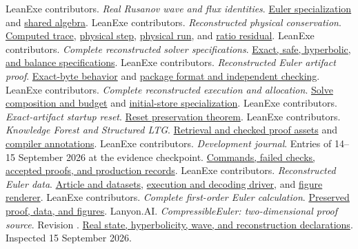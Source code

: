\documentclass[11pt]{article}
\newcommand{\longcode}[1]{\texttt{\seqsplit{#1}}}
\newcommand{\repo}[2]{\href{https://github.com/jsmorph/leanexe/blob/73e5b54ee6ba398cdd4d42feadc42e2c6ec5a33a/#1}{#2}}
\newcommand{\proofref}[2]{\repo{proofs/talos/lean/Project/#1}{#2}}
\begin{document}
\begin{thebibliography}{99}
 LeanExe contributors.  \emph{Real Rusanov wave and flux identities}.  \proofref{EulerRiemann/RealWaves.lean}{Euler specialization} and \proofref{ProofKit/RealLaxFriedrichs.lean}{shared algebra}.
 LeanExe contributors.  \emph{Reconstructed physical conservation}.  \proofref{EulerReconstructed/TraceBalance.lean}{Computed trace}, \proofref{EulerReconstructed/PhysicalStep.lean}{physical step}, \proofref{EulerReconstructed/PhysicalTrace.lean}{physical run}, and \proofref{EulerReconstructed/RatioResidual.lean}{ratio residual}.
 LeanExe contributors.  \emph{Complete reconstructed solver specifications}.  \proofref{EulerReconstructed/Spec.lean}{Exact, safe, hyperbolic, and balance specifications}.
 LeanExe contributors.  \emph{Reconstructed Euler artifact proof}.  \proofref{EulerReconstructed/ArtifactTranslation.lean}{Exact-byte behavior} and \repo{docs/artifact-format.md}{package format and independent checking}.
 LeanExe contributors.  \emph{Complete reconstructed execution and allocation}.  \proofref{EulerReconstructed/ExecutionSolve.lean}{Solve composition and budget} and \proofref{EulerReconstructed/SolveInitial.lean}{initial-store specialization}.
 LeanExe contributors.  \emph{Exact-artifact startup reset}.  \proofref{EulerReconstructed/HostInitial.lean}{Reset preservation theorem}.
 LeanExe contributors.  \emph{Knowledge Forest and Structured LTG}.  \repo{docs/ltg.md}{Retrieval and checked proof assets} and \repo{docs/annotations.md}{compiler annotations}.
 LeanExe contributors.  \emph{Development journal}.  Entries of 14--15 September 2026 at the evidence checkpoint.  \repo{journal.md}{Commands, failed checks, accepted proofs, and production records}.
 LeanExe contributors.  \emph{Reconstructed Euler data}.  \repo{data/euler-reconstructed-v1/README.md}{Article and datasets}, \repo{tools/euler-riemann-complete.js}{execution and decoding driver}, and \repo{tools/euler-riemann-plot.py}{figure renderer}.
 LeanExe contributors.  \emph{Complete first-order Euler calculation}.  \repo{data/euler-riemann-complete-v1/README.md}{Preserved proof, data, and figures}.
 Lanyon.AI.  \emph{CompressibleEuler: two-dimensional proof source}.  Revision \longcode{a736aa5f8b17efd225c4692404e2442361d06729}.  \href{https://github.com/lanyonai/CompressibleEuler/blob/a736aa5f8b17efd225c4692404e2442361d06729/proofs/compressible_euler_2d.lean}{Real state, hyperbolicity, wave, and reconstruction declarations}.  Inspected 15 September 2026.
\end{thebibliography}
\end{document}
